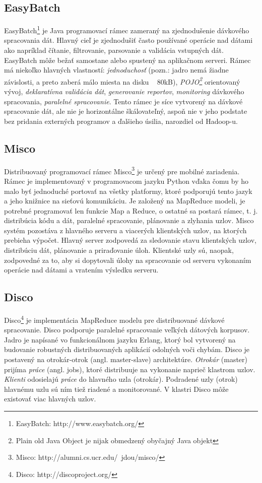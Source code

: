 \subsection{EasyBatch}
EasyBatch\footnote{EasyBatch: http://www.easybatch.org/} je Java programovací rámec zameraný na zjednodušenie dávkového spracovania dát. Hlavný cieľ je zjednodušiť často používané operácie nad dátami ako napríklad čítanie, filtrovanie, parsovanie a validácia vstupných dát. EasyBatch môže bežať samostane alebo spustený na aplikačnom serveri. Rámec má niekoľko hlavných vlastností: \textit{jednoduchosť} (pozn.: jadro nemá žiadne závislosti, a preto zaberá málo miesta na disku ~ 80kB), \textit{POJO\footnote{Plain old Java Object je nijak obmedzený obyčajný Java objekt}} orientovaný vývoj, \textit{deklaratívna validácia dát}, \textit{generovanie reportov}, \textit{monitoring} dávkového spracovania, \textit{paralelné spracovanie}. Tento rámec je síce vytvorený na dávkové spracovanie dát, ale nie je horizontálne škálovateľný, aspoň nie v jeho podstate bez pridania externých programov a ďalšieho úsilia, narozdiel od Hadoop-u.

\subsection{Misco}
Distribuovaný programovací rámec Misco\footnote{Misco: http://alumni.cs.ucr.edu/~jdou/misco/} \citep{dou2010misco} je určený pre mobilné zariadenia. Rámec je implementovaný v programovacom jazyku Python vďaka čomu by ho malo byť jednoduché portovať na všetky platformy, ktoré podporujú tento jazyk a jeho knižnice na sieťovú komunikáciu. Je založený na MapReduce modeli, je potrebné programovať len funkcie Map a Reduce, o ostatné sa postará rámec, t. j. distribúcia kódu a dát, paralelné spracovanie, plánovanie a zlyhania uzlov. Misco systém pozostáva z hlavného serveru a viacerých klientských uzlov, na ktorých prebieha výpočet. Hlavný server zodpovedá za sledovanie stavu klientských uzlov, distribúciu dát, plánovanie a priraďovanie úloh. Klientské uzly sú, naopak, zodpovedné za to, aby si dopytovali úlohy na spracovanie od serveru vykonaním operácie nad dátami a vratením výsledku serveru. 

\subsection{Disco}
Disco\footnote{Disco: http://discoproject.org/} je implementácia MapReduce modelu pre distribuované dávkové spracovanie. Disco podporuje paralelné spracovanie veľkých dátových korpusov. Jadro je napísané vo funkcionálnom jazyku Erlang, ktorý bol vytvorený na budovanie robustných distribuovaných aplikácií odolných voči chybám. Disco je postavený na otrokár-otrok (angl. master-slave) architektúre. \textit{Otrokár} (master) prijíma \textit{práce} (angl. jobs), ktoré distribuuje na vykonanie naprieč klastrom uzlov. \textit{Klienti} odosielajú \textit{práce} do hlavného uzla (otrokár). Podradené uzly (otrok) hlavnému uzlu sú ním tiež riadené a monitorované. V klastri Disco môže existovať viac hlavných uzlov.

